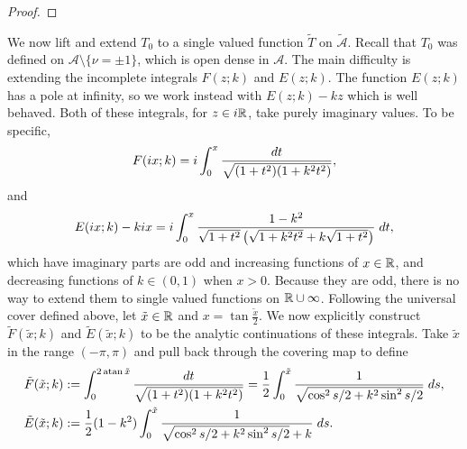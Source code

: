 \documentclass{article}
\begin{document}
\begin{lem}
\begin{proof}


\end{proof}
\end{lem}

We now lift and extend $T_0$ to a single valued function $\tilde{T}$ on $\mathcal{\tilde{A}}$. Recall that $T_0$ was defined on $\mathcal{A}\setminus\{\nu = \pm 1\}$, which is open dense in $\mathcal{A}$. The main difficulty is extending the incomplete integrals $F(z;k)$ and $E(z;k)$. The function $E(z;k)$ has a pole at infinity, so we work instead with $E(z;k) - kz$ which is well behaved. Both of these integrals, for $z\in i\mathbb{R}$, take purely imaginary values. To be specific, 
\[
F(i x; k)
= i \int_0^x \frac{dt}{\sqrt{(1+t^2)(1+k^2 t^2)}},
\]
and
\[
E(i x; k) - ki x
= i \int_0^x \frac{1-k^2}{\sqrt{1+t^2}\left( \sqrt{1+k^2t^2} + k\sqrt{1+t^2} \right)} \;dt,
\]
which have imaginary parts are odd and increasing functions of $x \in \mathbb{R}$, and decreasing functions of $k\in (0,1)$ when $x>0$. 
Because they are odd, there is no way to extend them to single valued functions on $\mathbb{R}\cup\infty$. Following the universal cover defined above, let $\tilde{x}\in\mathbb{R}$ and $x = \tan\frac{\tilde{x}}{2}$. We now explicitly construct $\tilde{F}(\tilde{x};k)$ and $\tilde{E}(\tilde{x};k)$ to be the analytic continuations of these integrals. Take $\tilde{x}$ in the range $(-\pi,\pi)$ and pull back through the covering map to define
\begin{align*}
\tilde{F}(\tilde{x};k)
&:= \int_0^{2 \operatorname{atan} \tilde{x}} \frac{dt}{\sqrt{(1+t^2)(1+k^2t^2)}}
= \frac{1}{2} \int_0^{\tilde{x}} \frac{1}{\sqrt{\cos^2 s/2 + k^2 \sin^2 s/2}} \;ds, \\
\tilde{E}(\tilde{x}; k)
&:= \frac{1}{2} (1-k^2) \int_0^{\tilde{x}} \frac{1}{\sqrt{\cos^2 s/2 + k^2\sin^2 s/2} + k}\;ds.
\end{align*}
\end{document}
